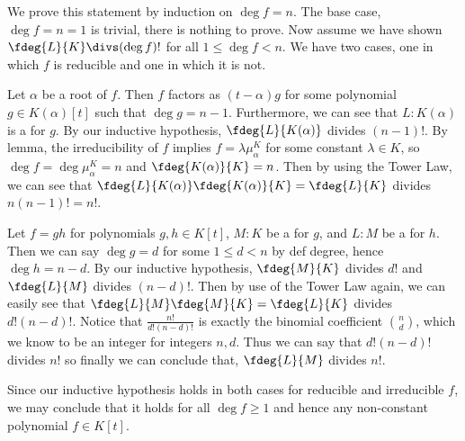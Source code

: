 \documentclass{article}
\begin{document}
\begin{solution}
We prove this statement by induction on $ \deg f = n $.
The base case, $ \deg f = n = 1 $ is trivial, there is nothing to prove.
Now assume we have shown $ \fdeg{L}{K}\divs (\deg f)! $ for all $ 1\leq\deg f<n $.
We have two cases, one in which $ f $ is reducible and one in which it is not.
\begin{subproof}
Let $ \alpha $ be a root of $ f $.
Then $ f $ factors as $ (t-\alpha)g $ for some polynomial $ g\in K(\alpha)[t] $ such that $ \deg g = n-1 $.
Furthermore, we can see that $ L:K(\alpha) $ is a \sfe for $ g $.
By our inductive hypothesis, $ \fdeg{L}{K(\alpha)} $ divides $ (n-1)! $.
By lemma, the irreducibility of $ f $ implies $ f=\lambda\mu_\alpha^{K} $ for some constant $ \lambda\in K $, so $ \deg f = \deg \mu_\alpha^K = n $ and $ \fdeg{K(\alpha)}{K}=n $.
Then by using the Tower Law, we can see that $ \fdeg{L}{K(\alpha)}\fdeg{K(\alpha)}{K} = \fdeg{L}{K}$ divides $ n(n-1)! = n! $.
\end{subproof}
\begin{subproof}
  Let $ f = gh $ for polynomials $ g,h\in K[t] $,  $ M:K $ be a \sfe for $ g $, and $ L:M $ be a \sfe for $ h $.
  Then we can say $ \deg g = d $ for some $ 1\leq d < n $ by def degree, hence $ \deg h = n-d $.
  By our inductive hypothesis, $ \fdeg{M}{K} $ divides $ d! $ and $ \fdeg{L}{M} $ divides $ (n-d)! $.
  Then by use of the Tower Law again, we can easily see that $ \fdeg{L}{M}\fdeg{M}{K} = \fdeg{L}{K} $ divides $ d!(n-d)! $.
  Notice that $ \frac{n!}{d!(n-d)!} $ is exactly the binomial coefficient $ \binom{n}{d} $, which we know to be an integer for integers $ n,d $.
  Thus we can say that $ d!(n-d)! $ divides $ n! $ so finally we can conclude that, $ \fdeg{L}{M} $ divides $ n! $.
\end{subproof}
Since our inductive hypothesis holds in both cases for reducible and irreducible $ f $, we may conclude that it holds for all $ \deg f \geq 1 $ and hence any non-constant polynomial $ f\in K[t] $.
\end{solution}
\end{document}
